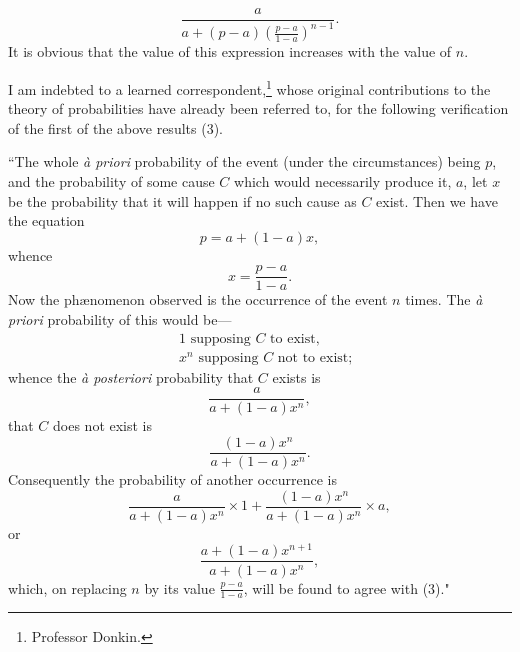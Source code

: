 \documentclass[oneside]{book}
\begin{document}
\begin{equation*}
\frac{a}{a+(p-a)\left({\displaystyle \frac{p-a}{1-a}}\right)^{n-1}}.
\end{equation*}
It is obvious that the value of this expression increases with the
value of $n$.

I am indebted to a learned correspondent,\footnote{Professor Donkin.} whose original
contributions to the theory of probabilities have already been referred
to, for the following verification of the first of the above
results (3).

``The whole \textit{\`{a} priori} probability of the event (under the
circumstances) being $p$, and the probability of some cause $C$ which
would necessarily produce it, $a$, let $x$ be the probability that it
will happen if no such cause as $C$ exist. Then we have the
equation
\begin{equation*}
p = a + (1-a) x,
\end{equation*}
whence
\begin{equation*}
x=\frac{p-a}{1-a}.
\end{equation*}
Now the ph\ae nomenon observed is the occurrence of the event $n$
times. The \textit{\`{a} priori} probability of this would be---
\begin{equation*}\begin{split}
& 1 \text{ supposing $C$ to exist,} \\
& x^n \text{ supposing $C$ not to exist;}
\end{split}\end{equation*}
whence the \textit{\`{a} posteriori} probability that $C$ exists is
\begin{equation*}
\frac{a}{a+(1-a)x^n},
\end{equation*}
that $C$ does not exist is
\begin{equation*}
\frac{(1-a)x^n}{a+(1-a)x^n}.
\end{equation*}
Consequently the probability of another occurrence is
\begin{equation*}
\frac{a}{a+(1-a)x^n}\times 1 + \frac{(1-a)x^n}{a+(1-a)x^n}\times a,
\end{equation*}
or
\begin{equation*}
\frac{a+(1-a)x^{n+1}}{a+(1-a)x^n},
\end{equation*}
which, on replacing $n$ by its value $\displaystyle \frac{p-a}{1-a}$, will be found to agree
with (3)."
\end{document}
